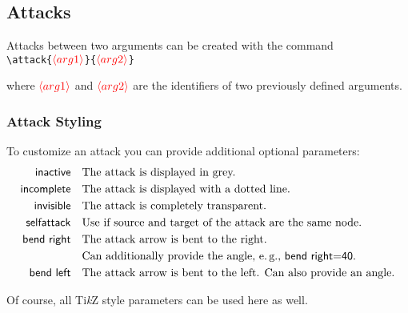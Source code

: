 \documentclass{article}
\newcommand{\tikzname}{Ti\emph{k}Z\xspace}
\newcommand{\opt}[2][red]{\ensuremath{\textcolor{#1}{\langle #2\rangle}}}
\begin{document}
\subsection{Attacks}
    Attacks between two arguments can be created with the command\\

    \noindent
    \verb|\attack{|\opt{arg1}\verb|}{|\opt{arg2}\verb|}|

    \begin{list}{}{\leftmargin=\parindent\rightmargin=0pt}
        \item where \opt{arg1} and \opt{arg2} are the identifiers of two previously defined arguments.
    \end{list}

    
\subsubsection{Attack Styling}
    To customize an attack you can provide additional optional parameters:
    \begin{align*}
        \mathsf{inactive} &\quad \text{The attack is displayed in grey.}\\
        \mathsf{incomplete} &\quad \text{The attack is displayed with a dotted line.}\\
        \mathsf{invisible} &\quad \text{The attack is completely transparent.}\\
        \mathsf{selfattack} &\quad \text{Use if source and target of the attack are the same node.}\\
        \mathsf{bend~right} &\quad \text{The attack arrow is bent to the right.}\\
        &\quad \text{Can additionally provide the angle, e.\,g., \textsf{bend~right=40}.}\\
        \mathsf{bend~left} &\quad \text{The attack arrow is bent to the left. Can also provide an angle.}\\
    \end{align*}
    
    Of course, all \tikzname style parameters can be used here as well.
\end{document}

